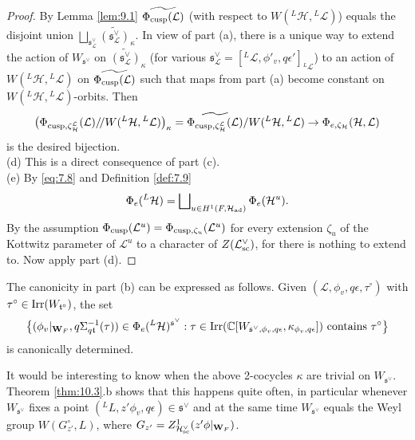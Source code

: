 \documentclass[11pt]{amsart}
\theoremstyle{definition}
\newcommand{\mb}{\mathbf}
\newcommand{\C}{\mathbb C}
\newcommand{\q}{/\!/}
\def\Irr{{\rm Irr}}
\def\cL{{\mathcal L}}
\def\cH{{\mathcal H}}
\def\fs{{\mathfrak s}}
\def\ft{{\mathfrak t}}
\def\ad{{\rm ad}}
\def\sc{{\rm sc}}
\def\cusp{{\rm cusp}}
\begin{document}
\begin{proof}
By Lemma \ref{lem:9.1} $\widetilde{\Phi_\cusp (\cL)}$ (with respect to 
$W({}^L \cH,{}^L \cL)$) equals the disjoint union $\bigsqcup_{\fs^\vee_\cL} 
\widetilde{(\fs^\vee_\cL )}_\kappa$. 
In view of part (a), there is a unique way to extend the action of $W_{\fs^\vee}$
on $\widetilde{(\fs^\vee_\cL )}_\kappa$ (for various $\fs^\vee_\cL = 
[{}^L \cL ,\phi'_v,q \epsilon']_{{}^L \cL}$) to an action of $W ({}^L \cH,{}^L \cL)$ 
on $\widetilde{\Phi_\cusp (\cL)}$ such that maps from part (a) become constant on
$W ({}^L \cH,{}^L \cL)$-orbits. Then
\[
\big( \Phi_{\cusp,\zeta_\cH^\cL} (\cL) \q W ({}^L \cH,{}^L \cL) \big)_\kappa = 
\widetilde{\Phi_{\cusp,\zeta_\cH^\cL} (\cL)} / W ({}^L \cH,{}^L \cL)  
\to \Phi_{e,\zeta_\cH} (\cH,\cL)
\]
is the desired bijection.\\
(d) This is a direct consequence of part (c).\\
(e) By \eqref{eq:7.8} and Definition \ref{def:7.9} 
\[
\Phi_e ({}^L \cH) = \bigsqcup\nolimits_{u \in H^1 (F,\cH_{\ad})} \Phi_e (\cH^u) .
\]
By the assumption $\Phi_\cusp (\cL^u) = \Phi_{\cusp,\zeta_u}(\cL^u)$ for every
extension $\zeta_u$ of the Kottwitz parameter of $\cL^u$ to a character of 
$Z(\cL^\vee_\sc)$, for there is nothing to extend to. Now apply part (d).
\end{proof}

The canonicity in part (b) can be expressed as follows. Given $({} \cL,\phi_v,
q\epsilon, \tau^\circ)$ with $\tau^\circ \in \Irr (W_{\ft^\circ})$, the set
\[
\big\{ (\phi_v |_{\mb W_F}, q\Sigma_{q \ft}^{-1}(\tau)) \in \Phi_e ({}^L \cH)^{\fs^\vee} : 
\tau \in \Irr (\C [W_{\fs^\vee,\phi_v ,q\epsilon},\kappa_{\phi_v ,q\epsilon}])
\text{ contains } \tau^\circ \big\}
\]
is canonically determined.

It would be interesting to know when the above 2-cocycles $\kappa$ are
trivial on $W_{\fs^\vee}$. Theorem \ref{thm:10.3}.b shows that this happens quite 
often, in particular whenever $W_{\fs^\vee}$ fixes a point 
$({}^L L,z' \phi_v,q \epsilon) \in \fs^\vee$ and at the same time $W_{\fs^\vee}$ equals the
Weyl group $W(G_{z'}^\circ,L)$, where $G_{z'} = Z^1_{\cH^\vee_{\sc}}(z' \phi |_{\mb W_F})$.
\end{document}
